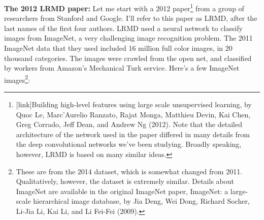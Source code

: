 \documentclass[a4paper,twoside,10pt]{book}
\begin{document}
\textbf{The 2012 LRMD paper:} Let me start with a 2012 paper\footnote{[link]Building high-level features using large scale unsupervised learning, by Quoc Le, Marc'Aurelio Ranzato, Rajat Monga, Matthieu Devin, Kai Chen, Greg Corrado, Jeff Dean, and Andrew Ng (2012). Note that the detailed architecture of the network used in the paper differed in many details from the deep convolutional networks we've been studying. Broadly speaking, however, LRMD is based on many similar ideas.} from a group of researchers from Stanford and Google. I'll refer to this paper as LRMD, after the last names of the first four authors. LRMD used a neural network to classify images from ImageNet, a very challenging image recognition problem. The 2011 ImageNet data that they used included 16 million full color images, in 20 thousand categories. The images were crawled from the open net, and classified by workers from Amazon's Mechanical Turk service. Here's a few ImageNet images\footnote{These are from the 2014 dataset, which is somewhat changed from 2011. Qualitatively, however, the dataset is extremely similar. Details about ImageNet are available in the original ImageNet paper, ImageNet: a large-scale hierarchical image database, by Jia Deng, Wei Dong, Richard Socher, Li-Jia Li, Kai Li, and Li Fei-Fei (2009).}:
\begin{center}
\end{center}
\end{document}
